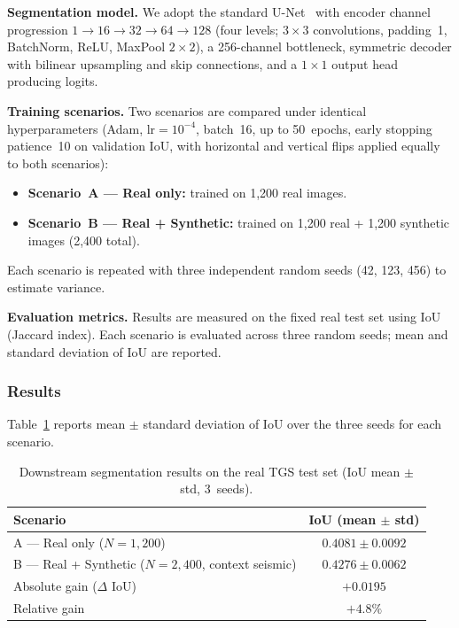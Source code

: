 \documentclass{ieeeaccess}
\begin{document}
\noindent\textbf{Segmentation model.} We adopt the standard U-Net~\cite{Ronneberger2015} with encoder channel progression $1 \to 16 \to 32 \to 64 \to 128$ (four levels; $3 \times 3$ convolutions, padding~1, BatchNorm, ReLU, MaxPool $2\times2$), a 256-channel bottleneck, symmetric decoder with bilinear upsampling and skip connections, and a $1\times1$ output head producing logits.

\noindent\textbf{Training scenarios.} Two scenarios are compared under identical hyperparameters (Adam, $\text{lr} = 10^{-4}$, batch~16, up to 50~epochs, early stopping patience~10 on validation IoU, with horizontal and vertical flips applied equally to both scenarios):
\begin{itemize}
    \item \textbf{Scenario~A --- Real only:} trained on 1,200 real images.
    \item \textbf{Scenario~B --- Real + Synthetic:} trained on 1,200 real + 1,200 synthetic images (2,400 total).
\end{itemize}
Each scenario is repeated with three independent random seeds (42, 123, 456) to estimate variance.

\noindent\textbf{Evaluation metrics.} Results are measured on the fixed real test set using IoU (Jaccard index). Each scenario is evaluated across three random seeds; mean and standard deviation of IoU are reported.

\subsubsection{Results}

Table~\ref{tab:downstream} reports mean $\pm$ standard deviation of IoU over the three seeds for each scenario.

\begin{table}[htbp]
    \centering
    \caption{Downstream segmentation results on the real TGS test set (IoU mean $\pm$ std, 3~seeds).}
    \label{tab:downstream}
    \begin{tabular}{lc}
        \toprule
        \textbf{Scenario} & \textbf{IoU (mean $\pm$ std)} \\
        \midrule
        A --- Real only ($N{=}1{,}200$)                        & $0.4081 \pm 0.0092$ \\
        B --- Real + Synthetic ($N{=}2{,}400$, context seismic) & $\mathbf{0.4276 \pm 0.0062}$ \\
        \midrule
        Absolute gain ($\Delta$ IoU)                           & $+0.0195$ \\
        Relative gain                                          & $+4.8\%$ \\
        \bottomrule
    \end{tabular}
\end{table}
\end{document}
